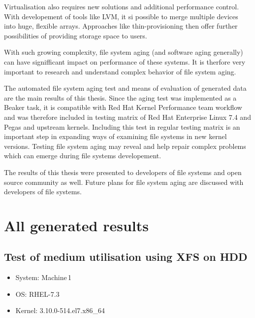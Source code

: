 \documentclass[
  color, %
  table, %
  lof,   %
  lot,   %
]{fithesis3}
\begin{document}

Virtualisation also requires new solutions and additional performance control. With developement of tools like LVM, it si possible to merge multiple devices into huge, flexible arrays. Approaches like thin-provisioning then offer further possibilities of providing storage space to users. 

With such growing complexity, file system aging (and software aging generally) can have signifficant impact on performance of these systems. It is therfore very important to research and understand complex behavior of file system aging.

The automated file system aging test and means of evaluation of generated data are the main results of this thesis. Since the aging test was implemented as a Beaker task, it is compatible with Red Hat Kernel Performance team workflow and was therefore included in testing matrix of Red Hat Enterprise Linux 7.4 and Pegas and upstream kernels. Including this test in regular testing matrix is an important step in expanding ways of examining file systems in new kernel versions. Testing file system aging may reveal and help repair complex problems which can emerge during file systems developement.

The results of this thesis were presented to developers of file systems and open source community as well. Future plans for file system aging are discussed with developers of file systems.




















\appendix %
\chapter{All generated results}\label{reports}



\section{Test of medium utilisation using XFS on HDD}

\begin{itemize}
\itemsep0em 
   \item System: Machine\,1
   \item OS: RHEL-7.3
   \item Kernel: 3.10.0-514.el7.x86\_64
\end{itemize}
\end{document}
